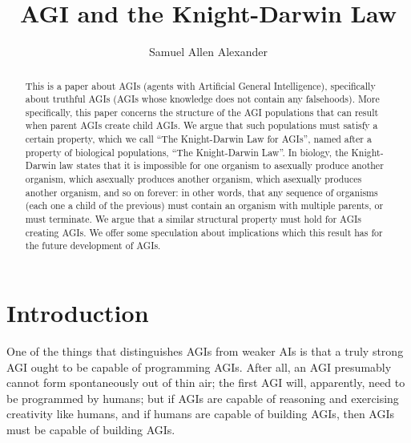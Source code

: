 \documentclass[runningheads]{llncs}
\begin{document}
\title{AGI and the Knight-Darwin Law}

\author{Samuel Allen Alexander}

\maketitle

\begin{abstract}
This is a paper about AGIs (agents with Artificial General Intelligence), specifically
about truthful AGIs (AGIs whose knowledge does not contain any falsehoods).
More specifically, this paper concerns the structure of the AGI populations that
can result when parent AGIs create child AGIs. We argue that such populations must
satisfy a certain property, which we call ``The Knight-Darwin Law for AGIs'',
named after a property of biological populations, ``The Knight-Darwin Law''.
In biology, the Knight-Darwin law states that it is impossible for one organism
to asexually produce another organism, which asexually produces another organism,
which asexually produces another organism, and so on forever: in other words,
that any sequence of organisms (each one a child of the previous) must contain
an organism with multiple parents, or must terminate. We argue that a similar
structural property must hold for AGIs creating AGIs. We offer some speculation
about implications which this result has for the future development of AGIs.


\end{abstract}

\section{Introduction}

One of the things that distinguishes AGIs from weaker AIs is that a truly
strong AGI ought to be capable of programming AGIs. After all, an AGI
presumably cannot form spontaneously out of thin air; the first AGI will,
apparently, need to be programmed by humans; but if AGIs are capable of
reasoning and exercising creativity like humans, and if humans are capable
of building AGIs, then AGIs must be capable of building AGIs.
\end{document}
